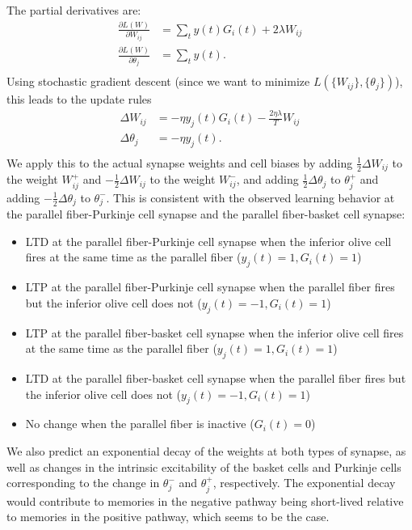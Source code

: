 \documentclass{article}
\theoremstyle{definition}
\begin{document}
The partial derivatives are:
\begin{align*}
\frac{\partial L(W)}{\partial W_{ij}} &= \sum_t y(t) G_i(t) + 2\lambda W_{ij}\\
\frac{\partial L(W)}{\partial \theta_j} &= \sum_t y(t).\\
\end{align*}
Using stochastic gradient descent (since we want to minimize
$L(\{W_{ij}\}, \{\theta_j\})$), this leads to the update rules
\begin{align*}
\Delta W_{ij} &= -\eta y_j(t) G_i(t) - \frac{2\eta\lambda}{T} W_{ij}\\
\Delta \theta_j &= -\eta y_j(t). \\
\end{align*}
We apply this to the actual synapse weights and cell biases by adding
$\frac{1}{2}\Delta W_{ij}$ to the weight $W^+_{ij}$ and
$-\frac{1}{2}\Delta W_{ij}$ to the weight $W^-_{ij}$, and adding
$\frac{1}{2}\Delta \theta_j$ to $\theta^+_j$ and adding
$-\frac{1}{2}\Delta \theta_j$ to $\theta^-_j$. This is consistent with
the observed learning behavior at the parallel fiber-Purkinje cell
synapse and the parallel fiber-basket cell synapse:
\begin{itemize} 
\item LTD at the parallel fiber-Purkinje cell synapse when the
  inferior olive cell fires at the same time as the parallel fiber
  ($y_j(t)=1, G_i(t)=1$)
\item LTP at the parallel fiber-Purkinje cell synapse when the
  parallel fiber fires but the inferior olive cell does not
  ($y_j(t)=-1, G_i(t)=1$)
\item LTP at the parallel fiber-basket cell synapse when the inferior
  olive cell fires at the same time as the parallel fiber ($y_j(t)=1,
  G_i(t)=1$)
\item LTD at the parallel fiber-basket cell synapse when the parallel
  fiber fires but the inferior olive cell does not ($y_j(t)=-1,
  G_i(t)=1$)
\item No change when the parallel fiber is inactive ($G_i(t)=0$)
\end{itemize}
We also predict an exponential decay of the weights at both types of
synapse, as well as changes in the intrinsic excitability of the
basket cells and Purkinje cells corresponding to the change in
$\theta^-_j$ and $\theta^+_j$, respectively. The exponential decay
would contribute to memories in the negative pathway being short-lived
relative to memories in the positive pathway, which seems to be the
case.
\end{document}
